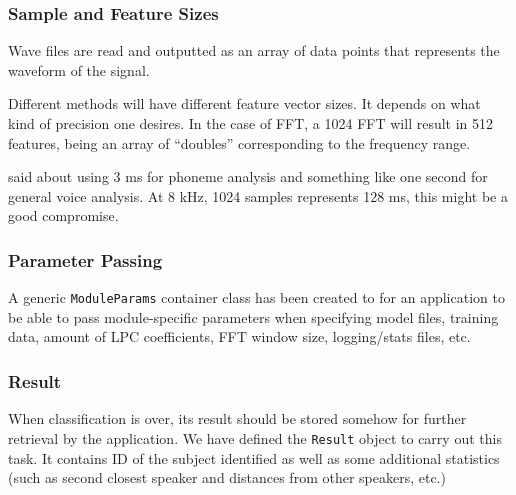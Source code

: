 \subsubsection{Sample and Feature Sizes}

Wave files are read and outputted as an array of
data points that represents the waveform of the signal.

Different methods will have different feature vector sizes.
It depends on what kind of precision one desires.
In the case of FFT, a 1024 FFT will result in 512 features,
being an array of ``doubles'' corresponding to the frequency range.

\cite{shaughnessy2000} said about using 3 ms for phoneme analysis and
something like one second for general voice analysis.  At 8 kHz, 1024 samples
represents 128 ms, this might be a good compromise.

\subsubsection{Parameter Passing}

A generic \verb+ModuleParams+ container class has been created to for an application
to be able to pass module-specific parameters when
specifying model files, training data,
amount of LPC coefficients, FFT window size, logging/stats files, etc.

\subsubsection{Result}

When classification is over, its result should be stored somehow
for further retrieval by the application. We have defined
the \verb+Result+ object to carry out this task. It contains
ID of the subject identified as well as some additional statistics
(such as second closest speaker and distances from other speakers, etc.)


